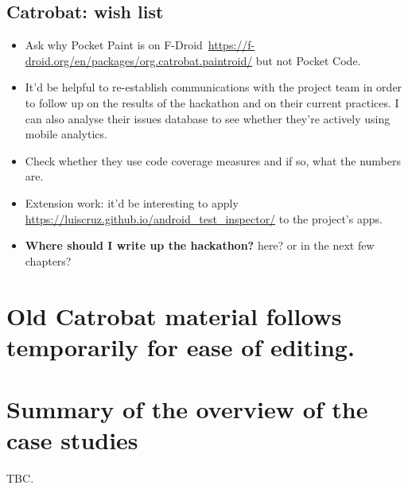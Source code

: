 \subsection*{Catrobat: wish list}
{\small
\begin{itemize}
    \itemsep0em
    \item Ask why Pocket Paint is on F-Droid~\url{https://f-droid.org/en/packages/org.catrobat.paintroid/} but not Pocket Code.
    \item It'd be helpful to re-establish communications with the project team in order to follow up on the results of the hackathon and on their current practices. I can also analyse their issues database to see whether they're actively using mobile analytics.
    \item Check whether they use code coverage measures and if so, what the numbers are.
    \item Extension work: it'd be interesting to apply \url{https://luiscruz.github.io/android_test_inspector/} to the project's apps.
    \item \textbf{Where should I write up the hackathon?} here? or in the next few chapters?
\end{itemize}
}  %

\dotfill


\section{Old Catrobat material follows temporarily for ease of editing.}


\clearpage




\section{Summary of the overview of the case studies}
TBC.

